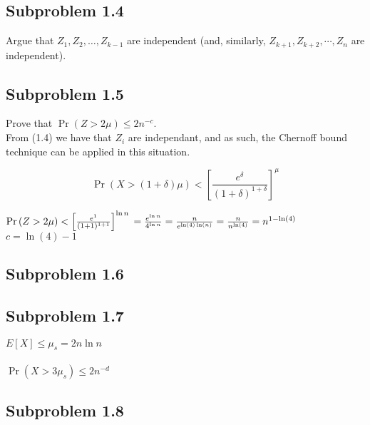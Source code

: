 \documentclass[article,a4paper,oneside]{memoir}
\newcommand{\+}[1]{\ensuremath{\boldsymbol{#1}}}
\begin{document}
\subsection{Subproblem 1.4}
Argue that $Z_1, Z_2, \ldots, Z_{k-1}$ are independent (and, similarly, $Z_{k+1}, Z_{k+2}, \cdots, Z_n$ are independent).

\subsection{Subproblem 1.5}
Prove that $\Pr (Z > 2\mu)\leq 2n^{-c}$.
\\
From (1.4) we have that $Z_i$ are independant, and as such, the Chernoff bound technique can be applied in this situation.

$$\Pr \left ( X > (1+\delta)\mu \right ) < \left [ \frac{e^\delta}{(1+\delta)^{1+\delta}} \right ]^\mu$$

$\Pr \left ( Z > 2\mu \right ) < \left [ \frac{e^1}{(1+1)^{1+1}} \right ]^{\ln n}
\\= \frac{e^{\ln n}}{4^{\ln n}} 
\\= \frac {n}{e^{\ln(4)\ln(n)}} 
\\= \frac{n}{n^{\ln(4)}}
\\= n^{1-\ln (4)}$\\
$ c=\ln(4)-1$



\subsection{Subproblem 1.6}

\subsection{Subproblem 1.7}
$E[X] \leq \mu_s = 2n\ln n$
\\\\
$\Pr (X > 3\mu_s) \leq 2n^{-d}$

\subsection{Subproblem 1.8}
\end{document}
